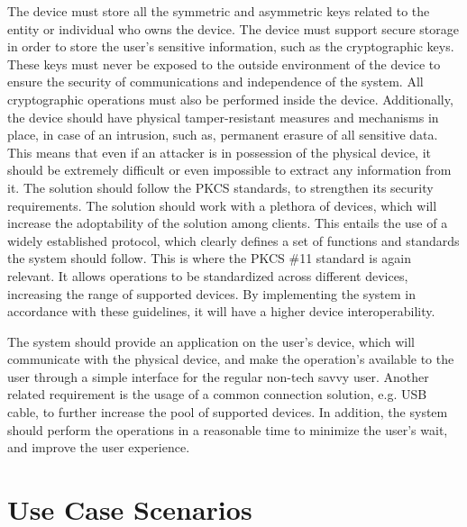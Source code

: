 The device must store all the symmetric and asymmetric keys related to the entity or individual who owns the device.
The device must support secure storage in order to store the user's sensitive information, such as the cryptographic keys.
These keys must never be exposed to the outside environment of the device to ensure the security of communications and independence of the system.
All cryptographic operations must also be performed inside the device.
Additionally, the device should have physical tamper-resistant measures and mechanisms in place, in case of an intrusion, such as, permanent erasure of all sensitive data. 
This means that even if an attacker is in possession of the physical device, it should be extremely difficult or even impossible to extract any information from it.
The solution should follow the \ac{PKCS} standards, to strengthen its security requirements.
The solution should work with a plethora of devices, which will increase the adoptability of the solution among clients. This entails the use of a widely established protocol, which clearly defines a set of functions and standards the system should follow.
This is where the \ac{PKCS} \#11 standard is again relevant. It allows operations to be standardized across different devices, increasing the range of supported devices. By implementing the system in accordance with these guidelines, it will have a higher device interoperability.

The system should provide an application on the user's device, which will communicate with the physical device, and make the operation's available to the user through a simple interface for the regular non-tech savvy user.
Another related requirement is the usage of a common connection solution, e.g. USB cable, to further increase the pool of supported devices.
In addition, the system should perform the operations in a reasonable time to minimize the user's wait, and improve the user experience.

\section{Use Case Scenarios}\label{chap:problem:scenarios}

